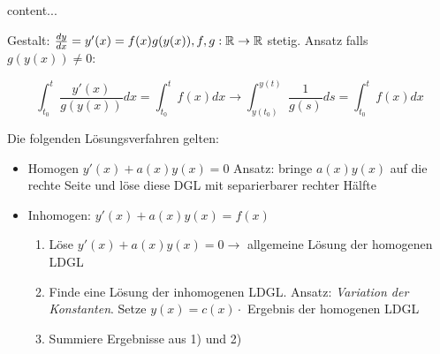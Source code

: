 \begin{definition}
	content...
\end{definition}

\begin{satz}
	
	Gestalt: $\frac{d y}{d x} = y'(x) = f(x)g(y(x)), f,g : \mathbb{R} \rightarrow \mathbb{R}$ stetig. Ansatz falls $g(y(x)) \neq 0$:
	
	\begin{equation*}
		\int_{t_0}^{t} \frac{y'(x)}{g(y(x))} dx = \int_{t_0}^{t} f(x) dx \rightarrow \int_{y(t_0)}^{y(t)} \frac{1}{g(s)} ds = \int_{t_0}^{t} f(x) dx
	\end{equation*}
\end{satz}


\begin{satz}
	Die folgenden Lösungsverfahren gelten:
	\begin{itemize}
		\item Homogen $y'(x) + a(x)y(x) = 0$ Ansatz: bringe $a(x)y(x)$ auf die rechte Seite und löse diese DGL mit separierbarer rechter Hälfte
		\item Inhomogen: $y'(x) + a(x)y(x) = f(x)$ 
			\begin{enumerate} [noitemsep]
				\item Löse $y'(x) +a(x)y(x) = 0 \rightarrow $ allgemeine Lösung der homogenen LDGL
				\item Finde eine Lösung der inhomogenen LDGL. Ansatz: \emph{Variation der Konstanten}. Setze $y(x) = c(x) \cdot$ Ergebnis der homogenen LDGL
				\item Summiere Ergebnisse aus 1) und 2)
			\end{enumerate}
	\end{itemize}
\end{satz}

